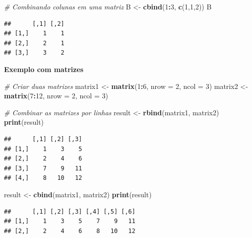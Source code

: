 \documentclass[
]{book}
\newenvironment{Shaded}{\begin{snugshade}}{\end{snugshade}}
\newcommand{\AttributeTok}[1]{\textcolor[rgb]{0.13,0.29,0.53}{#1}}
\newcommand{\CommentTok}[1]{\textcolor[rgb]{0.56,0.35,0.01}{\textit{#1}}}
\newcommand{\DecValTok}[1]{\textcolor[rgb]{0.00,0.00,0.81}{#1}}
\newcommand{\FunctionTok}[1]{\textcolor[rgb]{0.13,0.29,0.53}{\textbf{#1}}}
\newcommand{\NormalTok}[1]{#1}
\newcommand{\OtherTok}[1]{\textcolor[rgb]{0.56,0.35,0.01}{#1}}
\newcommand{\SpecialCharTok}[1]{\textcolor[rgb]{0.81,0.36,0.00}{\textbf{#1}}}
\theoremstyle{definition}
\theoremstyle{definition}
\theoremstyle{definition}
\theoremstyle{definition}
\theoremstyle{remark}
\begin{document}
\begin{Shaded}
\begin{Highlighting}[]
\CommentTok{\# Combinando colunas em uma matriz}
\NormalTok{B }\OtherTok{\textless{}{-}} \FunctionTok{cbind}\NormalTok{(}\DecValTok{1}\SpecialCharTok{:}\DecValTok{3}\NormalTok{, }\FunctionTok{c}\NormalTok{(}\DecValTok{1}\NormalTok{,}\DecValTok{1}\NormalTok{,}\DecValTok{2}\NormalTok{))}
\NormalTok{B}
\end{Highlighting}
\end{Shaded}

\begin{verbatim}
##      [,1] [,2]
## [1,]    1    1
## [2,]    2    1
## [3,]    3    2
\end{verbatim}

\textbf{Exemplo com matrizes}

\begin{Shaded}
\begin{Highlighting}[]
\CommentTok{\# Criar duas matrizes}
\NormalTok{matrix1 }\OtherTok{\textless{}{-}} \FunctionTok{matrix}\NormalTok{(}\DecValTok{1}\SpecialCharTok{:}\DecValTok{6}\NormalTok{, }\AttributeTok{nrow =} \DecValTok{2}\NormalTok{, }\AttributeTok{ncol =} \DecValTok{3}\NormalTok{)}
\NormalTok{matrix2 }\OtherTok{\textless{}{-}} \FunctionTok{matrix}\NormalTok{(}\DecValTok{7}\SpecialCharTok{:}\DecValTok{12}\NormalTok{, }\AttributeTok{nrow =} \DecValTok{2}\NormalTok{, }\AttributeTok{ncol =} \DecValTok{3}\NormalTok{)}

\CommentTok{\# Combinar as matrizes por linhas}
\NormalTok{result }\OtherTok{\textless{}{-}} \FunctionTok{rbind}\NormalTok{(matrix1, matrix2)}
\FunctionTok{print}\NormalTok{(result)}
\end{Highlighting}
\end{Shaded}

\begin{verbatim}
##      [,1] [,2] [,3]
## [1,]    1    3    5
## [2,]    2    4    6
## [3,]    7    9   11
## [4,]    8   10   12
\end{verbatim}

\begin{Shaded}
\begin{Highlighting}[]
\NormalTok{result }\OtherTok{\textless{}{-}} \FunctionTok{cbind}\NormalTok{(matrix1, matrix2)}
\FunctionTok{print}\NormalTok{(result)}
\end{Highlighting}
\end{Shaded}

\begin{verbatim}
##      [,1] [,2] [,3] [,4] [,5] [,6]
## [1,]    1    3    5    7    9   11
## [2,]    2    4    6    8   10   12
\end{verbatim}
\end{document}
